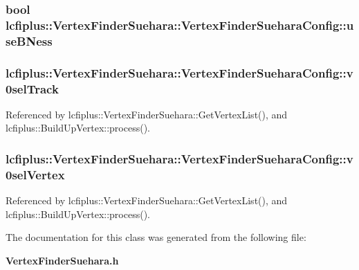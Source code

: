 \subsubsection[{use\-B\-Ness}]{\setlength{\rightskip}{0pt plus 5cm}bool lcfiplus\-::\-Vertex\-Finder\-Suehara\-::\-Vertex\-Finder\-Suehara\-Config\-::use\-B\-Ness}\label{classlcfiplus_1_1VertexFinderSuehara_1_1VertexFinderSueharaConfig_af4b91524acf5947b5d5ea75c46d03b89}
\subsubsection[{v0sel\-Track}]{ lcfiplus\-::\-Vertex\-Finder\-Suehara\-::\-Vertex\-Finder\-Suehara\-Config\-::v0sel\-Track}\label{classlcfiplus_1_1VertexFinderSuehara_1_1VertexFinderSueharaConfig_aa450c6856d828dd1d2177c08b224e33b}


Referenced by lcfiplus\-::\-Vertex\-Finder\-Suehara\-::\-Get\-Vertex\-List(), and lcfiplus\-::\-Build\-Up\-Vertex\-::process().

\subsubsection[{v0sel\-Vertex}]{ lcfiplus\-::\-Vertex\-Finder\-Suehara\-::\-Vertex\-Finder\-Suehara\-Config\-::v0sel\-Vertex}\label{classlcfiplus_1_1VertexFinderSuehara_1_1VertexFinderSueharaConfig_a9f39e4759afdd0ff20cf81746c854918}


Referenced by lcfiplus\-::\-Vertex\-Finder\-Suehara\-::\-Get\-Vertex\-List(), and lcfiplus\-::\-Build\-Up\-Vertex\-::process().



The documentation for this class was generated from the following file\-:\begin{DoxyCompactItemize}
\item 
{\bf Vertex\-Finder\-Suehara.\-h}\end{DoxyCompactItemize}
